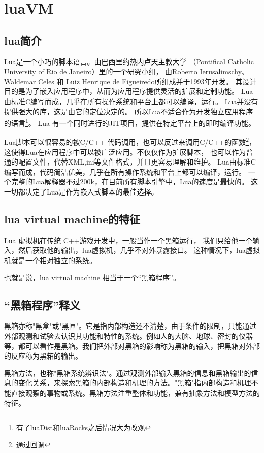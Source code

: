 \chapter{luaVM}

\section{lua简介}

Lua是一个小巧的脚本语言。由巴西里约热内卢天主教大学
（Pontifical Catholic University of Rio de Janeiro）里的一个研究小组，
由Roberto Ierusalimschy、Waldemar Celes 和 Luiz Henrique de Figueiredo所组成并于1993年开发。 
其设计目的是为了嵌入应用程序中，从而为应用程序提供灵活的扩展和定制功能。
Lua由标准C编写而成，几乎在所有操作系统和平台上都可以编译，运行。
Lua并没有提供强大的库，这是由它的定位决定的。
所以Lua不适合作为开发独立应用程序的语言\footnote{有了luaDist和luaRocks之后情况大为改观}。
Lua 有一个同时进行的JIT项目，提供在特定平台上的即时编译功能。

Lua脚本可以很容易的被C/C++ 代码调用，也可以反过来调用C/C++的函数\footnote{通过回调}，
这使得Lua在应用程序中可以被广泛应用。不仅仅作为扩展脚本，
也可以作为普通的配置文件，代替XML,ini等文件格式，并且更容易理解和维护。
Lua由标准C编写而成，代码简洁优美，几乎在所有操作系统和平台上都可以编译，运行。
一个完整的Lua解释器不过200k，在目前所有脚本引擎中，Lua的速度是最快的。
这一切都决定了Lua是作为嵌入式脚本的最佳选择。

\section{lua virtual machine的特征}

Lua 虚拟机在传统 C++游戏开发中，一般当作一个黑箱运行，
我们只给他一个输入，然后获取他的输出，lua虚拟机，几乎不对外暴露接口。
这种情况下，lua虚拟机就是一个相对独立的系统。

也就是说，lua virtual machine 相当于一个“黑箱程序”。

\section{“黑箱程序”释义}

黑箱亦称"黑盒"或"黑匣"。它是指内部构造还不清楚，由于条件的限制，只能通过外部观测和试验去认识其功能和特性的系统。例如人的大脑、地球、密封的仪器等，都可以看作是黑箱。我们把外部对黑箱的影响称为黑箱的输入，把黑箱对外部的反应称为黑箱的输出。

黑箱方法，也称"黑箱系统辨识法"。通过观测外部输入黑箱的信息和黑箱输出的信息的变化关系，来探索黑箱的内部构造和机理的方法。"黑箱"指内部构造和机理不能直接观察的事物或系统。黑箱方法注重整体和功能，兼有抽象方法和模型方法的特征。

